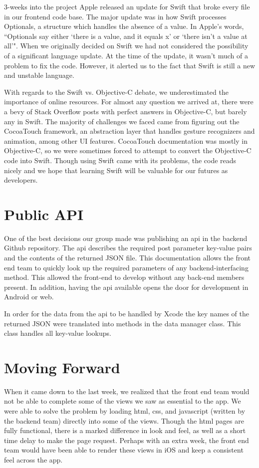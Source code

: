 \documentclass[12pt]{article}
\begin{document}
3-weeks into the project Apple released an update for Swift that broke every file in our frontend code base. 
The major update was in how Swift processes Optionals, a structure which handles the absence of a value. 
In Apple's words, ``Optionals say either `there is a value, and it equals x' or `there isn't a value at all'". 
When we originally decided on Swift we had not considered the possibility of a significant language update. 
At the time of the update, it wasn't much of a problem to fix the code. 
However, it alerted us to the fact that Swift is still a new and unstable language. 

With regards to the Swift vs. Objective-C debate, we underestimated the importance of online resources. 
For almost any question we arrived at, there were a bevy of Stack Overflow posts with perfect answers in Objective-C, but barely any in Swift. 
The majority of challenges we faced came from figuring out the CocoaTouch framework, an abstraction layer that handles gesture recognizers and animation, among other UI features. 
CocoaTouch documentation was mostly in Objective-C, so we were sometimes forced to attempt to convert the Objective-C code into Swift. 
Though using Swift came with its problems, the code reads nicely and we hope that learning Swift will be valuable for our futures as developers.

\section{Public API}
One of the best decisions our group made was publishing an api in the backend Github repository. 
The api describes the required post parameter key-value pairs and the contents of the returned JSON file. 
This documentation allows the front end team to quickly look up the required parameters of any backend-interfacing method. 
This allowed the front-end to develop without any back-end members present.
In addition, having the api available opens the door for development in Android or web.

In order for the data from the api to be handled by Xcode the key names of the returned JSON were translated into methods in the data manager class. This class handles all key-value lookups. 

\section{Moving Forward}

When it came down to the last week, we realized that the front end team would not be able to complete some of the views we saw as essential to the app. 
We were able to solve the problem by loading html, css, and javascript (written by the backend team) directly into some of the views. 
Though the html pages are fully functional, there is a marked difference in look and feel, as well as a short time delay to make the page request. 
Perhaps with an extra week, the front end team would have been able to render these views in iOS and keep a consistent feel across the app. 
\end{document}
